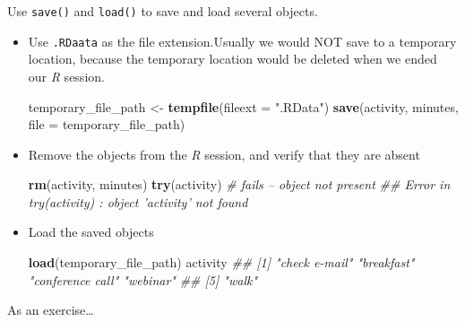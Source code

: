 \documentclass[]{book}
\newenvironment{Shaded}{\begin{snugshade}}{\end{snugshade}}
\newcommand{\CommentTok}[1]{\textcolor[rgb]{0.56,0.35,0.01}{\textit{#1}}}
\newcommand{\DataTypeTok}[1]{\textcolor[rgb]{0.13,0.29,0.53}{#1}}
\newcommand{\KeywordTok}[1]{\textcolor[rgb]{0.13,0.29,0.53}{\textbf{#1}}}
\newcommand{\NormalTok}[1]{#1}
\newcommand{\StringTok}[1]{\textcolor[rgb]{0.31,0.60,0.02}{#1}}
\begin{document}
Use \texttt{save()} and \texttt{load()} to save and load several objects.

\begin{itemize}
\item
  Use \texttt{.RDaata} as the file extension.Usually we would NOT save to a temporary location, because the temporary location would be deleted when we ended our \emph{R} session.

\begin{Shaded}
\begin{Highlighting}[]
\NormalTok{temporary_file_path <-}\StringTok{ }\KeywordTok{tempfile}\NormalTok{(}\DataTypeTok{fileext =} \StringTok{".RData"}\NormalTok{)}
\KeywordTok{save}\NormalTok{(activity, minutes, }\DataTypeTok{file =}\NormalTok{ temporary_file_path)}
\end{Highlighting}
\end{Shaded}
\item
  Remove the objects from the \emph{R} session, and verify that they are absent

\begin{Shaded}
\begin{Highlighting}[]
\KeywordTok{rm}\NormalTok{(activity, minutes)}
\KeywordTok{try}\NormalTok{(activity) }\CommentTok{# fails -- object not present}
\CommentTok{## Error in try(activity) : object 'activity' not found}
\end{Highlighting}
\end{Shaded}
\item
  Load the saved objects

\begin{Shaded}
\begin{Highlighting}[]
\KeywordTok{load}\NormalTok{(temporary_file_path)}
\NormalTok{activity}
\CommentTok{## [1] "check e-mail"    "breakfast"       "conference call" "webinar"        }
\CommentTok{## [5] "walk"}
\end{Highlighting}
\end{Shaded}
\end{itemize}

As an exercise\ldots{}
\end{document}
